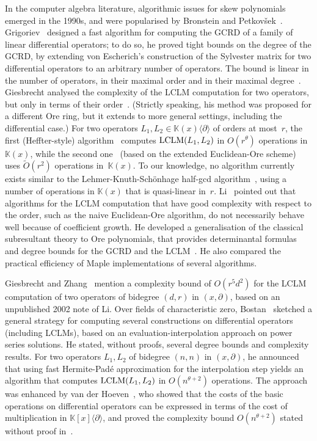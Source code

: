 \documentclass{sig-alt-full}
\def\K {\ensuremath{\mathbb{K}}}
\newcommand{\x}{x}
\newcommand{\Dx}{\partial}
\newcommand{\lclm} { {\rm LCLM}}
\begin{document}
In the computer algebra literature, algorithmic issues for skew polynomials
emerged in the 1990s, and were popularised by Bronstein and
Petkov{\v{s}}ek~\cite{BrPe94,BrPe96}. 
Grigoriev~\cite[\S6]{Grigoriev90} designed a fast algorithm for computing the
GCRD of a family of linear differential operators; to do so, he proved tight
bounds on the degree of the GCRD, by extending von Escherich's construction of
the Sylvester matrix for two differential operators to an arbitrary number of
operators. The bound is linear in the number of operators, in their maximal
order and in their maximal degree~\cite[Lemma~5.1]{Grigoriev90}.
Giesbrecht analysed the complexity of the
LCLM computation for two operators, but only in terms of their order~\cite{Giesbrecht92,Giesbrecht98}.
(Strictly speaking, his method was proposed for a different Ore ring, but it
extends to more general settings, including the differential case.) For two
operators $L_1, L_2\in \K(\x)\langle \Dx\rangle$ of orders at most~$r$, the first (Heffter-style)
algorithm~\cite[Lemma~5]{Giesbrecht92}  computes $\lclm(L_1,L_2)$ in
$O(r^\theta)$ operations in~$\K(x)$, while the second
one~\cite[Lemma~2.1]{Giesbrecht98} (based on the extended Euclidean-Ore scheme) uses
$\widetilde{O}(r^2)$ operations in~$\K(x)$. To our knowledge, no algorithm currently exists similar
to the Lehmer-Knuth-Sch\"onhage half-gcd algorithm~\cite[Chapter~11]{GaGe03},
using a number of operations in $\K(x)$ that is quasi-linear in~$r$. 
Li~\cite{Li98} pointed out that algorithms for the LCLM computation that have
good complexity with respect to the order, such as the naive Euclidean-Ore
algorithm, do not necessarily behave well because of coefficient growth.
He developed a generalisation of the classical subresultant theory to Ore
polynomials, that provides determinantal formulas and degree bounds for the
GCRD and the LCLM~\cite{Li98}. He also compared the practical
efficiency of Maple implementations of several algorithms.

Giesbrecht and Zhang~\cite[Theorem~2.1]{GiZh03} mention a complexity
bound of $O(r^5 d^2)$ for the LCLM computation of two operators of bidegree
$(d,r)$ in $(x,\Dx)$, based on an unpublished 2002 note of Li.
Over fields of characteristic zero,
Bostan~\cite[Chapter~10]{Bostan03} sketched a general strategy for computing
several constructions on differential operators (including LCLMs), based on an
evaluation-interpolation approach on power series solutions. He stated,
without proofs, several degree bounds and complexity results. For two
operators $L_1,L_2$ of bidegree $(n,n)$ in $(x,\Dx)$, he announced that using
fast Hermite-Padé approximation for the interpolation step yields an algorithm
that computes $\lclm(L_1,L_2)$ in $O(n^{\theta+2})$ operations. 
The approach was enhanced by van der Hoeven~\cite{VdHoeven11},
who showed that the costs of the basic operations on
differential operators can be expressed in terms of the cost of multiplication
in $\K[\x]\langle \Dx\rangle$, and proved
the complexity bound $O(n^{\theta+2})$ stated without proof in~\cite[\S10.5]{Bostan03}.
\end{document}
